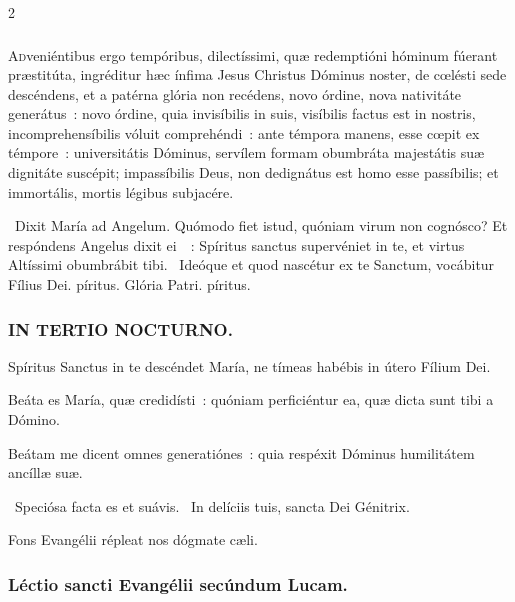 \documentclass[9pt,twoside]{extarticle}
\begin{document}
\begin{multicols}{2}
{\subsubsection*{\center {}}
\lettrine{A}dveniéntibus ergo tempóribus, dilectíssimi, quæ redemptióni hóminum fúerant præstitúta, ingréditur hæc ínfima Jesus Christus Dóminus noster, de cœlésti sede descéndens, et a patérna glória non recédens, novo órdine, nova nativitáte generátus~: novo órdine, quia invisíbilis in suis, visíbilis factus est in nostris, incomprehensíbilis vóluit comprehéndi~: ante témpora manens, esse cœpit ex témpore~: universitátis Dóminus, servílem formam obumbráta majestátis suæ dignitáte suscépit; impassíbilis Deus, non dedignátus est homo esse passíbilis; et immortális, mortis légibus subjacére.

\begin{tightlist}{}
\item {}~Dixit María ad Angelum. Quómodo fiet istud, quóniam virum non cognósco? Et respóndens Angelus dixit ei~~: \textred{*} Spíritus sanctus supervéniet in te, et virtus Altíssimi obumbrábit tibi. ~Ideóque et quod nascétur ex te Sanctum, vocábitur Fílius Dei. píritus. Glória Patri. píritus.
\end{tightlist}

\subsubsection*{\center \textsc{IN TERTIO NOCTURNO.}}
\begin{tightlist}{}
\item {} Spíritus Sanctus in te descéndet María, ne tímeas habébis in útero Fílium Dei.
\item {} Beáta es María, quæ credidísti~: quóniam perficiéntur ea, quæ dicta sunt tibi a Dómino.
\item {} Beátam me dicent omnes generatiónes~: quia respéxit Dóminus humilitátem ancíllæ suæ.
\item {}~Speciósa facta es et suávis. ~In delíciis tuis, sancta Dei Génitrix.
\item {\small {} Fons Evangélii répleat nos dógmate cæli.}
\end{tightlist}

\subsubsection*{\center Léctio sancti Evangélii secúndum Lucam.}
}
\end{multicols}
\end{document}
